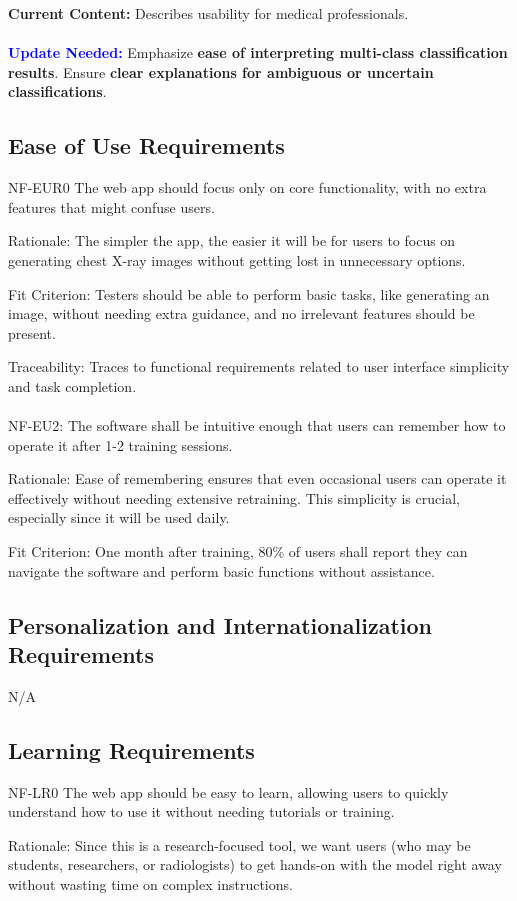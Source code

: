 \documentclass[12pt]{article}
\begin{document}
\textbf{Current Content:} Describes usability for medical professionals. \\
\\
\textbf{\textcolor{blue}{Update Needed:}} Emphasize \textbf{ease of interpreting multi-class classification results}. Ensure \textbf{clear explanations for ambiguous or uncertain classifications}.

\subsection{Ease of Use Requirements}
NF-EUR0 The web app should focus only on core functionality, with no extra features that might 
confuse users.

Rationale: The simpler the app, the easier it will be for users to focus on generating chest X-ray 
images without getting lost in unnecessary options.

Fit Criterion: Testers should be able to perform basic tasks, like generating an image, without 
needing extra guidance, and no irrelevant features should be present.

Traceability: Traces to functional requirements related to user interface simplicity and task 
completion.
\\\\
NF-EU2: The software shall be intuitive enough that users can remember how to operate it after 1-2 
training sessions.

Rationale: Ease of remembering ensures that even occasional users can operate it effectively 
without needing extensive retraining. This simplicity is crucial, especially since it will be used 
daily.

Fit Criterion: One month after training, 80\% of users shall report they can navigate the software 
and perform basic functions without assistance.
\subsection{Personalization and Internationalization Requirements}
N/A

\subsection{Learning Requirements}
NF-LR0 The web app should be easy to learn, allowing users to quickly understand how to use it 
without needing tutorials or training.

Rationale: Since this is a research-focused tool, we want users (who may be students, researchers, 
or radiologists) to get hands-on with the model right away without wasting time on complex 
instructions.
\end{document}

